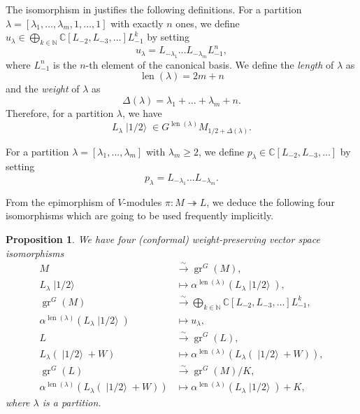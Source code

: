 \documentclass[a4paper, 12pt, reqno]{amsart}
\newtheorem{proposition}[theorem]{Proposition}
\theoremstyle{remark}
\numberwithin{equation}{subsection}
\DeclareMathOperator{\gr}{gr}
\DeclareMathOperator{\len}{len}
\DeclareMathOperator{\vachalf}{|1/2\rangle}
\begin{document}
The isomorphism in  justifies the following definitions.
For a partition $\lambda = [\lambda_1, \dots, \lambda_m, 1, \dots, 1]$ with exactly $n$ ones, we define $u_{\lambda} \in \bigoplus_{k \in \mathbb{N}}\mathbb{C}[L_{-2}, L_{-3}, \dots]L_{-1}^k$ by setting
\begin{equation*}
  u_{\lambda} = L_{-\lambda_1}\dots L_{-\lambda_m}L_{-1}^n,
\end{equation*}
where $L_{-1}^n$ is the $n$-th element of the canonical basis.
We define the \emph{length} of $\lambda$ as
\begin{equation*}
  \len(\lambda) = 2m + n
\end{equation*}
and the \emph{weight} of $\lambda$ as
\begin{equation*}
  \Delta(\lambda) = \lambda_1 + \dots + \lambda_m + n.
\end{equation*}
Therefore, for a partition $\lambda$, we have
\begin{equation*}
  L_{\lambda}\vachalf \in G^{\len(\lambda)}M_{1/2 + \Delta(\lambda)}.
\end{equation*}

For a partition $\lambda = [\lambda_1, \dots, \lambda_m]$ with $\lambda_m \ge 2$, we define $p_{\lambda} \in \mathbb{C}[L_{-2}, L_{-3}, \dots]$ by setting
\begin{equation*}
  p_{\lambda} = L_{-\lambda_1}\dots L_{-\lambda_m}.
\end{equation*}

From the epimorphism of $V$-modules $\pi: M \twoheadrightarrow L$, we deduce the following four isomorphisms which are going to be used frequently implicitly.

\begin{proposition}
  \label{prp:17}
  We have four (conformal) weight-preserving vector space isomorphisms
  \begin{align*}
    M &\xrightarrow{\sim} \gr^G(M), \\
    L_{\lambda}\vachalf &\mapsto \alpha^{\len(\lambda)}(L_{\lambda}\vachalf), \\
    \gr^G(M) &\xrightarrow{\sim} \bigoplus_{k \in \mathbb{N}}\mathbb{C}[L_{-2}, L_{-3}, \dots]L_{-1}^k, \\
    \alpha^{\len(\lambda)}(L_{\lambda}\vachalf) &\mapsto u_{\lambda}, \\
    L &\xrightarrow{\sim} \gr^G(L), \\
    L_{\lambda}(\vachalf + W) &\mapsto \alpha^{\len(\lambda)}(L_{\lambda}(\vachalf + W)), \\
    \gr^G(L) &\xrightarrow{\sim} \gr^G(M)/K, \\
    \alpha^{\len(\lambda)}(L_{\lambda}(\vachalf + W)) &\mapsto \alpha^{\len(\lambda)}(L_{\lambda}\vachalf) + K,
  \end{align*}
  where $\lambda$ is a partition.
\end{proposition}
\end{document}
